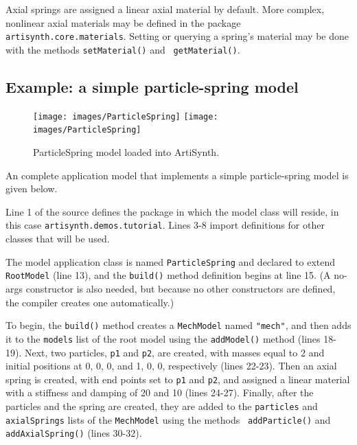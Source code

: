Axial springs are assigned a linear axial material by default.  More
complex, nonlinear axial materials may be defined in the package {\tt
artisynth.core.materials}. Setting or querying a spring's material
may be done with the methods {\tt setMaterial()} and {\tt
getMaterial()}.

\subsection{Example: a simple particle-spring model}
\label{ParticleSpringExample:sec}

\begin{figure}[t]
\begin{center}
\iflatexml
 \texttt{[image: images/ParticleSpring]}
\else
 \texttt{[image: images/ParticleSpring]}
\fi
\end{center}
\caption{ParticleSpring model loaded into ArtiSynth.}
\label{ParticleSpring:fig}
\end{figure}

An complete application model that implements a simple particle-spring
model is given below. 
\lstset{numbers=left}

\lstset{numbers=none}

Line 1 of the source defines the package in which the model class will
reside, in this case {\tt artisynth.demos.tutorial}. Lines 3-8 import
definitions for other classes that will be used.

The model application class is named {\tt ParticleSpring} and declared
to extend {\tt RootModel} (line 13), and the {\tt build()} method
definition begins at line 15. (A no-args constructor is also needed,
but because no other constructors are defined, the compiler creates
one automatically.)

To begin, the {\tt build()} method creates a {\tt MechModel} named
{\tt "mech"}, and then adds it to the {\tt models} list of the root model
using the {\tt addModel()} method (lines 18-19). Next, two particles,
{\tt p1} and {\tt p2}, are created, with masses equal to 2 and initial
positions at 0, 0, 0, and 1, 0, 0, respectively (lines 22-23). Then an
axial spring is created, with end points set to {\tt p1} and {\tt p2},
and assigned a linear material with a stiffness and damping of 20 and
10 (lines 24-27). Finally, after the particles and the spring are
created, they are added to the {\tt particles} and {\tt axialSprings}
lists of the {\tt MechModel} using the methods {\tt
addParticle()} and {\tt addAxialSpring()} (lines 30-32).

